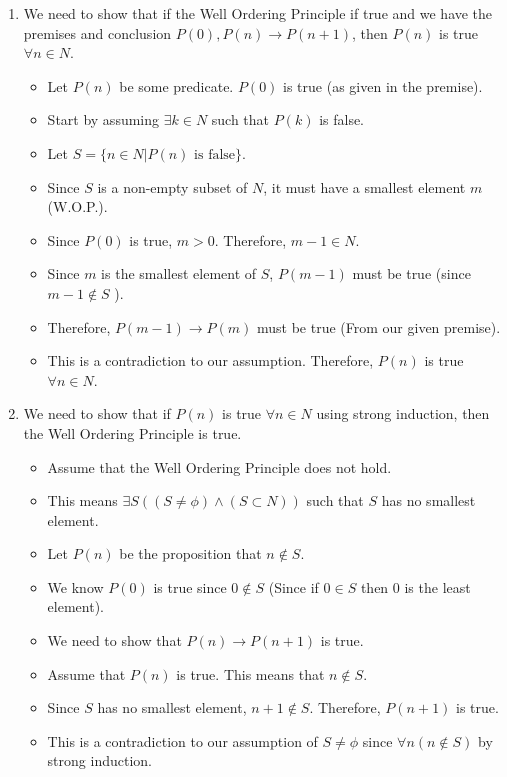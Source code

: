 \documentclass[a4paper]{article}
\begin{document}
\begin{enumerate}
\begin{enumerate}
        \item We need to show that if the Well Ordering Principle if true and we have the premises and conclusion $P(0), P(n) \rightarrow P(n+1)$, then $P(n)$ is true $\forall n \in N$.
        \begin{itemize}
            \item Let $P(n)$ be some predicate. $P(0)$ is true (as given in the premise).
            \item Start by assuming $\exists k \in N$ such that $P(k)$ is false. 
            \item Let $S = \{ n \in N | P(n) \text{ is false} \}$. 
            \item Since $S$ is a non-empty subset of $N$, it must have a smallest element $m$ (W.O.P.).
            \item Since $P(0)$ is true, $m > 0$. Therefore, $m - 1 \in N$.
            \item Since $m$ is the smallest element of $S$, $P(m - 1)$ must be true (since $m-1 \notin S$ ).
            \item Therefore, $P(m - 1) \rightarrow P(m)$ must be true (From our given premise).
            \item This is a contradiction to our assumption. Therefore, $P(n)$ is true $\forall n \in N$. \\
        \end{itemize}

        \item We need to show that if $P(n)$ is true $\forall n \in N$ using strong induction, then the Well Ordering Principle is true. \\
        \begin{itemize}
            \item Assume that the Well Ordering Principle does not hold. 
            \item This means $\exists S ((S \ne \phi) \land (S \subset N))$ such that $S$ has no smallest element.
            \item Let $P(n)$ be the proposition that $n \notin S$.
            \item We know $P(0)$ is true since $0 \notin S$ (Since if $0 \in S$ then $0$ is the least element).
            \item We need to show that $P(n) \rightarrow P(n+1)$ is true. 
            \item Assume that $P(n)$ is true. This means that $n \notin S$.
            \item Since $S$ has no smallest element, $n+1 \notin S$. Therefore, $P(n+1)$ is true.
            \item This is a contradiction to our assumption of $S \ne \phi$ since $\forall n (n \notin S)$ by strong induction.
        \end{itemize}


\end{enumerate}
\end{enumerate}
\end{document}
